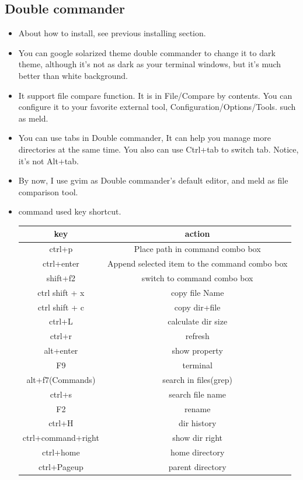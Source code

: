 \documentclass[a4paper,12pt,twoside]{book}
\begin{document}
\subsection{Double commander}
\begin{itemize}
		\item About how to install, see previous installing section.

		\item You can google solarized theme double commander to change it to dark theme, although it's not as dark as your terminal windows, but it's much better than white background. 

		\item It support file compare function. It is in File/Compare by contents.  You can configure it to your favorite external tool, Configuration/Options/Tools. such as meld. 

		\item You can use tabs in Double commander, It can help you manage more directories at the same time. You also can use Ctrl+tab to switch tab. Notice, it's not Alt+tab. 

		\item By now, I use gvim as Double commander's default editor, and meld as file comparison tool. 

		\item command used key shortcut.\\			

\begin{tabular}{|c|c|}
\hline 
\textbf{key} & \textbf{action} \\ 
\hline 
ctrl+p & Place path in command combo box   \\ 
\hline 
ctrl+enter  & Append selected item to the command combo box \\ 
\hline 
shift+f2  & switch to command combo box \\ 

\hline 
ctrl shift + x & copy file Name \\ 
\hline 
ctrl shift + c & copy dir+file \\ 

\hline \hline  
ctrl+L & calculate dir size  \\ 
\hline 
ctrl+r & refresh  \\ 
\hline 
alt+enter & show property \\ 

\hline 
F9 & terminal  \\ 

\hline 
 alt+f7(Commands) & search in files(grep) \\ 
\hline 
ctrl+s  & search file name \\ 
\hline 
F2  & rename \\ 
\hline
ctrl+H  & dir history \\ 

\hline 
ctrl+command+right  & show dir right  \\ 
\hline 
ctrl+home  & home directory \\ 
\hline 
ctrl+Pageup  & parent directory  \\ 
\hline 
 
\end{tabular} 
\end{itemize}
\end{document}
